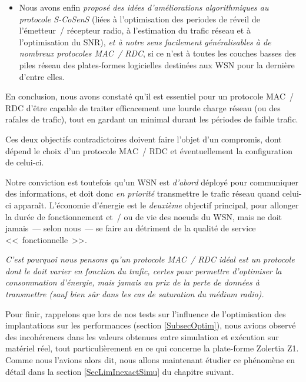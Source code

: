 \begin{itemize}
\item Nous avons enfin \emph{proposé des idées d'améliorations
algorithmiques au protocole S-CoSenS} (liées à l'optimisation des periodes
de réveil de l'émetteur~/ récepteur radio, à l'estimation du trafic réseau
et à l'optimisation du SNR), \emph{et à notre sens facilement généralisables
à de nombreux protocoles MAC~/ RDC}, si ce n'est à toutes les couches basses
des piles réseau des plates-formes logicielles destinées aux WSN pour la
dernière d'entre elles.

\end{itemize}

\newpage

En conclusion, nous avons constaté qu'il est essentiel pour un protocole
MAC~/ RDC d'être capable de traiter efficacement une lourde charge réseau
(ou des rafales de trafic), tout en gardant un  minimal
durant les périodes de faible trafic.

Ces deux objectifs contradictoires doivent faire l'objet d'un compromis,
dont dépend le choix d'un protocole MAC~/ RDC et éventuellement la
configuration de celui-ci.

Notre conviction est toutefois qu'un WSN est \emph{d'abord} déployé pour
communiquer des informations, et doit donc \emph{en priorité} transmettre
le trafic réseau quand celui-ci apparaît. L'économie d'énergie est le
\emph{deuxième} objectif principal, pour allonger la durée de fonctionnement
et~/ ou de vie des noeuds du WSN, mais ne doit jamais~--- selon nous~---
se faire au détriment de la qualité de service <<~fonctionnelle~>>.

\emph{C'est pourquoi nous pensons qu'un protocole MAC~/ RDC idéal est un
protocole dont le  doit varier en fonction du trafic,
certes pour permettre d'optimiser la consommation d'énergie, mais jamais
au prix de la perte de données à transmettre (sauf bien sûr dans les cas
de saturation du médium radio).}

\bigskip

Pour finir, rappelons que lors de nos tests sur l'influence de
l'optimisation des implantations sur les performances (section
\vref{SubsecOptim}), nous avions observé des incohérences dans les
valeurs obtenues entre simulation et exécution sur matériel réel, tout
particulièrement en ce qui concerne la plate-forme Zolertia Z1. Comme nous
l'avions alors dit, nous allons maintenant étudier ce phénomène en détail
dans la section \ref{SecLimInexactSimu} du chapitre suivant.


